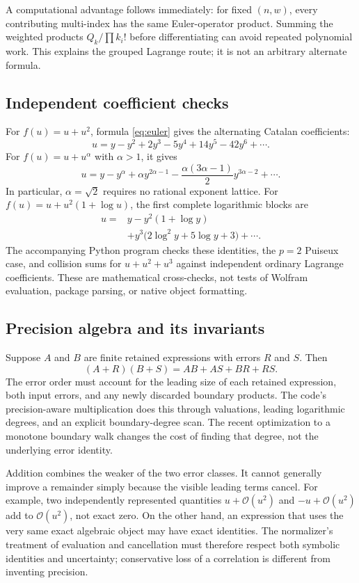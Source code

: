 \documentclass[11pt,a4paper]{article}
\newcommand{\OO}{\mathcal O}
\theoremstyle{remark}\newtheorem{remark}[proposition]{Remark}
\begin{document}
A computational advantage follows immediately: for fixed $(n,w)$, every contributing multi-index has the same Euler-operator product. Summing the weighted products $Q_k/\prod k_i!$ before differentiating can avoid repeated polynomial work. This explains the grouped Lagrange route; it is not an arbitrary alternate formula.

\subsection{Independent coefficient checks}
For $f(u)=u+u^2$, formula \eqref{eq:euler} gives the alternating Catalan coefficients:
\[
 u=y-y^2+2y^3-5y^4+14y^5-42y^6+\cdots.
\]
For $f(u)=u+u^\alpha$ with $\alpha>1$, it gives
\[
 u=y-y^\alpha+\alpha y^{2\alpha-1}
 -\frac{\alpha(3\alpha-1)}2 y^{3\alpha-2}+\cdots.
\]
In particular, $\alpha=\sqrt2$ requires no rational exponent lattice. For
$f(u)=u+u^2(1+\log u)$, the first complete logarithmic blocks are
\begin{align*}
 u={}&y-y^2(1+\log y)\\
 &+y^3\bigl(2\log^2y+5\log y+3\bigr)+\cdots.
\end{align*}
The accompanying Python program checks these identities, the $p=2$ Puiseux case, and collision sums for $u+u^2+u^3$ against independent ordinary Lagrange coefficients. These are mathematical cross-checks, not tests of Wolfram evaluation, package parsing, or native object formatting.

\subsection{Precision algebra and its invariants}
Suppose $A$ and $B$ are finite retained expressions with errors $R$ and $S$. Then
\[
 (A+R)(B+S)=AB+AS+BR+RS.
\]
The error order must account for the leading size of each retained expression, both input errors, and any newly discarded boundary products. The code's precision-aware multiplication does this through valuations, leading logarithmic degrees, and an explicit boundary-degree scan. The recent optimization to a monotone boundary walk changes the cost of finding that degree, not the underlying error identity.\cite{core}

Addition combines the weaker of the two error classes. It cannot generally improve a remainder simply because the visible leading terms cancel. For example, two independently represented quantities $u+\OO(u^2)$ and $-u+\OO(u^2)$ add to $\OO(u^2)$, not exact zero. On the other hand, an expression that uses the very same exact algebraic object may have exact identities. The normalizer's treatment of evaluation and cancellation must therefore respect both symbolic identities and uncertainty; conservative loss of a correlation is different from inventing precision.\cite{arithmetic}
\end{document}
